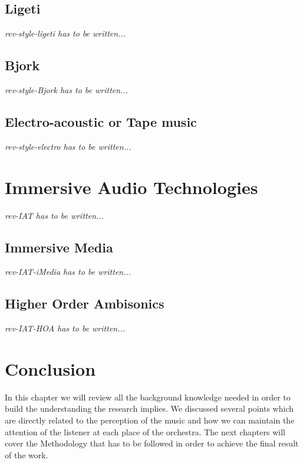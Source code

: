 \documentclass[letterpaper, openright]{report}
\begin{document}
			\subsection{Ligeti} %
			\label{subsub:rev-style-ligeti}
\textit{rev-style-ligeti has to be written...}
 
			\subsection{Bjork} %
			\label{subsub:rev-style-Bjork}
\textit{rev-style-Bjork has to be written...}
 
			\subsection{Electro-acoustic or Tape music} %
			\label{subsub:rev-style-electro}
\textit{rev-style-electro has to be written...}
    
    \section{Immersive Audio Technologies} %
	\label{sub:rev-IAT}
\textit{rev-IAT has to be written...}

			\subsection{Immersive Media} %
			\label{subsub:rev-IAT-iMedia}
\textit{rev-IAT-iMedia has to be written...}

			\subsection{Higher Order Ambisonics} %
			\label{subsub:rev-IAT-HOA}
\textit{rev-IAT-HOA has to be written...}

    
    \section{Conclusion} %
	\label{sub:rev-conclusion}
In this chapter we will review all the background knowledge needed in order to build the understanding the research implies.  We discussed several points which are directly related to the perception of the music and how we can maintain the attention of the listener at each place of the orchestra.\newline
The next chapters will cover the Methodology that has to be followed in order to achieve the final result of the work.
\end{document}
